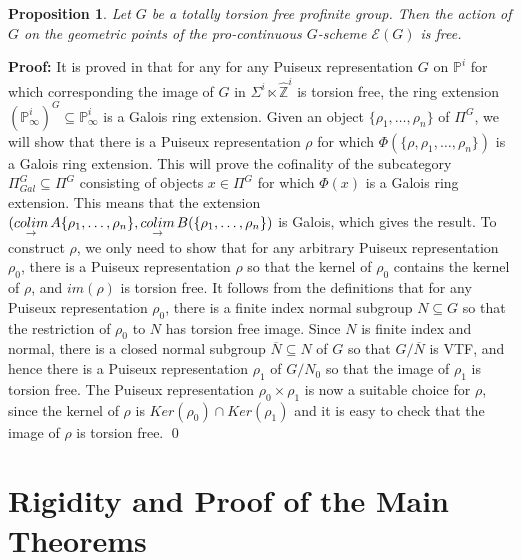 \documentclass[11pt]{article}
\newcommand\mb{\mathbb}
\newcommand\mc{\mathcal}
\newtheorem{Proposition}{Proposition}[section]
\newenvironment{Proof}{\par\noindent\textbf{Proof:}}
{\qed}
\begin{document}
\begin{Proposition} \label{puiseuxgalois}
Let $G$ be a totally torsion free profinite group. Then the action of $G$ on the geometric points of  the pro-continuous $G$-scheme $\mc{E}(G)$ is free.  
\end{Proposition}
\begin{Proof}
    It is proved in \cite{royg1} that for any for any Puiseux representation $G$ on $\mb{P}^i$ for which corresponding the image of $G$ in $\Sigma ^i \ltimes \hat{\mb{Z}}^i$ is torsion free, the ring extension $(\mb{P}_{\infty}^i) ^G \subseteq \mb{P}^i_{\infty} $ is a Galois ring extension.  Given an object $\{ \rho_1, \ldots , \rho _n\}$ of $\Pi^G$, we will show that there is a Puiseux representation $\rho$ for which  $\Phi (\{ \rho, \rho _1, \ldots , \rho _n\})$ is a Galois ring extension.  This will prove the cofinality of the subcategory  $\Pi ^G_{Gal} \subseteq \Pi^G$ consisting of objects $x \in \Pi^G$ for which $\Phi (x)$ is a Galois ring extension.  This means that the extension 
    $( \underset{\rightarrow}{colim}\hspace{.05cm} A\{ \rho _1, \ldots , \rho _n \}, \underset{\rightarrow}{colim}\hspace{.05cm} B(\{ \rho _1, \ldots , \rho _n \})$ is Galois, which gives the result.  To construct $\rho$, we only need to show that for any arbitrary Puiseux representation $\rho _0$, there is a Puiseux representation $\rho$ so that the kernel of $\rho _0$ contains the kernel of $\rho$, and $im(\rho )$ is torsion free.  It follows from the definitions that for any Puiseux representation $\rho_0$, there is a finite index normal subgroup $N \subseteq G$ so that the restriction of $\rho _0$ to $N$ has torsion free image.  Since $N$ is finite index and normal, there is a closed normal subgroup $\overline{N}\subseteq N$ of $G$ so that $G/\overline{N}$ is VTF, and hence there is a Puiseux representation $\rho _1$ of $G/N_0$ so that the image of $\rho _1 $ is torsion free.  The Puiseux representation $\rho _0 \times \rho _1$ is now a suitable choice for $\rho$, since the kernel of $\rho$ is $Ker(\rho _0) \cap Ker (\rho _1)$ and it is easy to check that the image of $\rho$ is torsion free.  
\end{Proof} 






\section{Rigidity and Proof of the Main Theorems}
\end{document}
